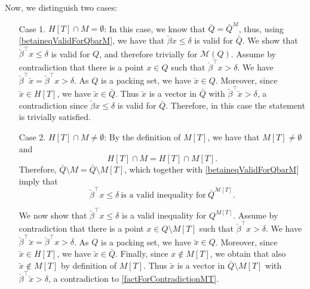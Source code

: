 \documentclass[11pt]{article}
\newcommand{\Z}{\mathbb{Z}}
\newcommand{\R}{\mathbb{R}}
\renewcommand{\L}{\mathcal{L}}
\newcommand{\Mset}{M}
\newcommand{\M}{\mathcal{\Mset}}
\newcommand{\Tset}{T}
\newcommand{\bpar}{\beta}
\newcommand{\cred}{\color{black}}
\def\int{\mathop{\rm int}}
\def\spann{\mathop{\rm span}}
\begin{document}
Now, we {\cred distinguish} two cases:
\begin{itemize}
\item[Case 1.] $H[\Tset] \cap \Mset = \emptyset$: In this case, we know that $\bar Q = {\bar Q}^\Mset$, thus, using \eqref{betaineqValidForQbarM}, we have that $\breve \bpar x \leq \delta$ is valid for $\bar Q$. We show that $\breve \bpar^\top x \le \delta$ is valid for $Q$, and therefore trivially for $\M(Q)$. 
Assume by contradiction that there is a point $x \in Q$ such that $\breve \bpar^\top x > \delta$.
We have $\breve \bpar^\top \breve x = \breve \bpar^\top x > \delta$.
As $Q$ is a packing set, we have $\breve x \in Q$.
Moreover, since $\breve x \in H[T]$, we have $\breve x \in \bar Q$.
Thus $\breve x$ is a vector in $\bar Q$ with $\breve \bpar^\top \breve x > \delta$, a contradiction since $\breve \bpar x \leq \delta$ is valid for $\bar Q$.
Therefore, in this case the statement is trivially satisfied.

\item[Case 2.] $H[\Tset] \cap \Mset \neq \emptyset$: By the definition of $M[T]$, we have that $\Mset[\Tset] \neq \emptyset$ and 
$$H[\Tset] \cap \Mset = H[\Tset] \cap \Mset[T].$$
Therefore, $\bar Q \setminus \Mset = \bar Q \setminus \Mset[T]$, which together with \eqref{betaineqValidForQbarM} imply that
\begin{equation}
\label{factForContradictionMT}
\breve \bpar^\top x \le \delta \ \text{is a valid inequality for} \ {\bar Q}^{\M[T]}.
\end{equation}

We now show that $\breve \bpar^\top x \le \delta$ is a valid inequality for $Q^{\Mset[T]}$.
Assume by contradiction that there is a point $x \in Q \setminus \Mset[T]$ such that $\breve \bpar^\top x > \delta$.
We have $\breve \bpar^\top \breve x = \breve \bpar^\top  x > \delta$.
As $Q$ is a packing set, we have $\breve x \in Q$.
Moreover, since $\breve x \in H[T]$, we have $\breve x \in \bar Q$.
Finally, since $x \notin \Mset[T]$, we obtain that also $\breve x \notin \Mset[T]$ by definition of $\Mset[T]$.
Thus $\breve x$ is a vector in $\bar Q \setminus \Mset[T]$ with $\breve \bpar^\top \breve x > \delta$, a contradiction to \eqref{factForContradictionMT}.
\end{itemize}
\end{document}
